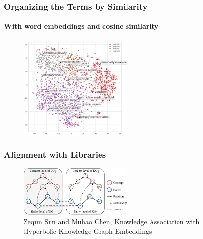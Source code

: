 \documentclass[10pt, handout]{beamer}
\begin{document}
\begin{frame}
    \frametitle{Organizing the Terms by Similarity}
    \framesubtitle{With word embeddings and cosine similarity}
            \begin{figure}
                \centering
                \includegraphics[width=0.5\textwidth]{../Images/scatter_option5.png}
            \end{figure}
\end{frame}

\begin{frame}
    \frametitle{Alignment with Libraries}
            \begin{figure}
                \centering
                \includegraphics[width=0.5\textwidth]{../Images/example.png}
                \caption{Zequn Sun and Muhao Chen, Knowledge Association with Hyperbolic Knowledge Graph Embeddings}
            \end{figure}
\end{frame}
\end{document}
